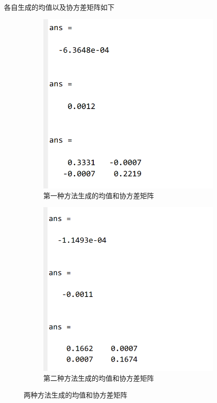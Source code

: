\documentclass[12pt]{ctexart}
\begin{document}
\vspace{2em}
各自生成的均值以及协方差矩阵如下
\begin{figure}[h]

    \begin{subfigure}{0.45\textwidth}
        \includegraphics[width=0.9\linewidth]{./figure/task1_2a.png}
        \caption{第一种方法生成的均值和协方差矩阵}
    \end{subfigure}
    \begin{subfigure}{0.45\textwidth}
        \includegraphics[width=0.9\linewidth]{./figure/task1_2b.png}
        \caption{第二种方法生成的均值和协方差矩阵}
    \end{subfigure}

    \caption{两种方法生成的均值和协方差矩阵}
\end{figure}
\end{document}
